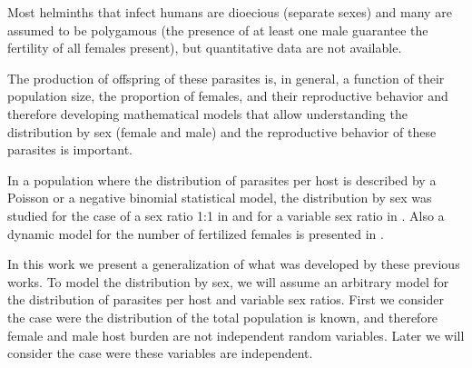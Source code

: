 \documentclass[12pt,a4paper]{article}
\theoremstyle{plain}%
\theoremstyle{definition}
\theoremstyle{remark}
\begin{document}
	Most helminths that infect humans are dioecious (separate sexes) and many are assumed to be polygamous (the presence of at least one male guarantee the fertility of all females present), but quantitative data are not available\cite{anderson1992infectious}.
	
	The production of offspring of these parasites is, in general, a function of their population size, the proportion of females, and their reproductive behavior and therefore
	developing mathematical models that allow understanding the distribution by sex (female and male) and the reproductive behavior of these parasites is important.
	

	
	In a population where the distribution of parasites per host is described by a Poisson or a negative binomial statistical model, the distribution by sex was studied for the case of a sex ratio 1:1 in \cite{may1977togetherness} and for a variable sex ratio in \cite{may1993biased}.
	Also a dynamic model for the number of fertilized females is presented in \cite{leyton1968stochastic}.
	
	
	
	In this work we present a generalization of what was developed by these previous works.
	To model the distribution by sex, we will assume an arbitrary model for the distribution of parasites per host and variable sex ratios. 
	First we consider the case were the distribution of the total population is known, and therefore female and male host burden are not independent random variables. Later we will consider the case were these variables are independent. 
	
\end{document}
